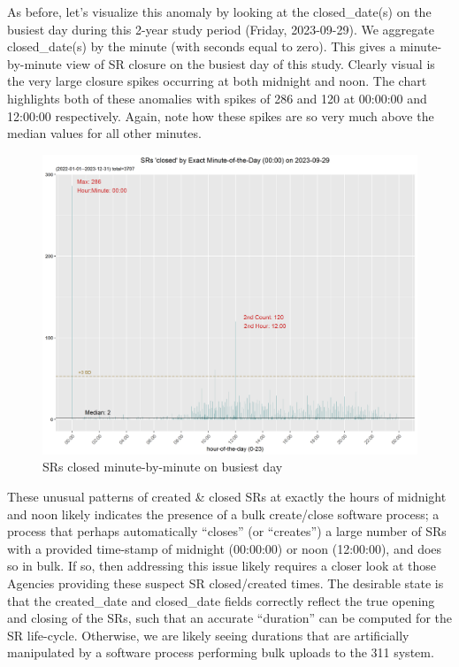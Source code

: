 \documentclass[12pt, titlepage]{article}
\begin{document}
	As before, let's visualize this anomaly by looking at the closed\_date(s) on the busiest day
	during this 2-year study period (Friday, 2023-09-29). We aggregate closed\_date(s) by the
	minute (with seconds equal to zero). This gives a minute-by-minute view of SR closure
	on the busiest day of this study. Clearly visual is the very large closure spikes occurring
	at both midnight and noon. The chart highlights both of these anomalies with spikes
	of 286 and 120 at 00:00:00 and 12:00:00 respectively. Again, note how these spikes
	are so very much above the median values for all other minutes.

 	\begin{figure}[H]
		 \centering
		 \includegraphics[width=\textwidth]{SR_closed_by_minute_of_busiest_day.png}
		 \caption{SRs closed minute-by-minute on busiest day}
		 \label{fig:busiestclosed}
	\end{figure}	

	These unusual patterns of created \& closed SRs at exactly the hours of midnight and noon likely indicates
	the presence of a bulk create/close software process; a process that perhaps automatically ``closes'' (or ``creates'') 
	a large number of SRs with a provided time-stamp of midnight (00:00:00) or noon (12:00:00), and does so in bulk. 
	If so, then addressing this issue likely requires a closer look at those Agencies providing these suspect SR closed/created times.
	 The desirable state is that the created\_date and closed\_date fields correctly reflect the true opening and closing 
	 of the SRs, such that an accurate ``duration'' can be computed for the SR life-cycle. Otherwise, we are likely seeing 
	 durations that are artificially manipulated by a software process performing bulk uploads to the 311 system.
\end{document}
